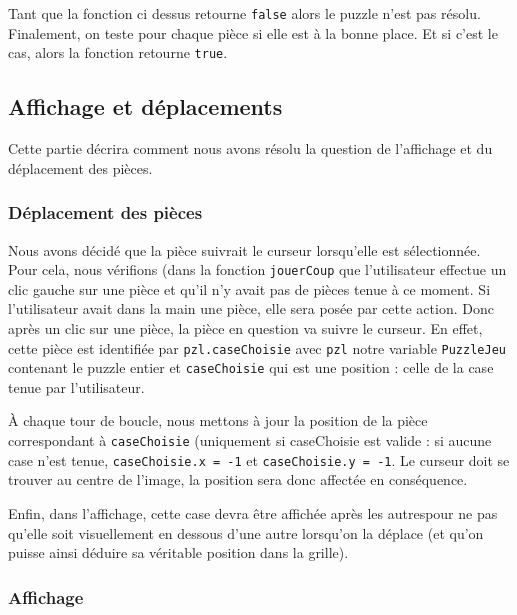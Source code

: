 \documentclass[]{article}
\newcommand{\variable}[1]{\noindent \texttt{#1}}
\begin{document}
Tant que la fonction ci dessus retourne \variable{false} alors le puzzle n'est pas résolu. Finalement, on teste pour chaque pièce si elle est à la bonne place. Et si c'est le cas, alors la fonction retourne \variable{true}. 




\newpage
\subsection{Affichage et déplacements}

Cette partie décrira comment nous avons résolu la question de l'affichage et du déplacement des pièces.

\subsubsection{Déplacement des pièces}

Nous avons décidé que la pièce suivrait le curseur lorsqu'elle est sélectionnée. Pour cela, nous vérifions (dans la fonction \variable{jouerCoup} que l'utilisateur effectue un clic gauche sur une pièce et qu'il n'y avait pas de pièces tenue à ce moment. Si l'utilisateur avait dans la main une pièce, elle sera posée par cette action. Donc après un clic sur une pièce, la pièce en question va suivre le curseur. En effet, cette pièce est identifiée par \variable{pzl.caseChoisie} avec \variable{pzl} notre variable \variable{PuzzleJeu} contenant le puzzle entier et \variable{caseChoisie} qui est une position : celle de la case tenue par l'utilisateur.

À chaque tour de boucle, nous mettons à jour la position de la pièce correspondant à \variable{caseChoisie} (uniquement si caseChoisie est valide : si aucune case n'est tenue, \variable{caseChoisie.x = -1} et \variable{caseChoisie.y = -1}. Le curseur doit se trouver au centre de l'image, la position sera donc affectée en conséquence.

Enfin, dans l'affichage, cette case devra être affichée après les autrespour ne pas qu'elle soit visuellement en dessous d'une autre lorsqu'on la déplace (et qu'on puisse ainsi déduire sa véritable position dans la grille).

\subsubsection{Affichage}
\end{document}
